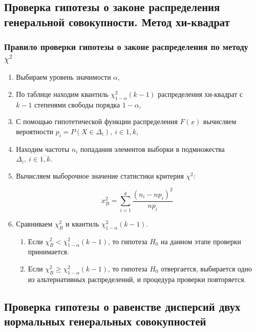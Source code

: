 \documentclass[12pt,a4paper]{article}
\begin{document}
	\subsection{Проверка гипотезы о законе распределения генеральной
		совокупности. Метод хи-квадрат}

	\subsubsection{Правило проверки гипотезы о законе распределения по
		методу \( \chi^2 \)}

	\begin{enumerate}
		\item Выбираем уровень значимости \( \alpha \),
		\item По таблице находим квантиль \( \chi_{1-\alpha}^2 (k - 1) \)
			распределения хи-квадрат с \( k - 1 \) степенями свободы порядка
			\( 1 - \alpha \),
		\item С помощью гипотетической функции распределения \( F(x) \)
			вычисляем вероятности
			\( p_i = P(X \in \Delta_i), \ i \in \overline{1,k} \),
		\item Находим частоты \( n_i \) попадания элементов выборки в
			подмножества \( \Delta_i, \ i \in \overline{1,k} \).
		\item Вычисляем выборочное значение статистики критерия \( \chi^2 \):

		\[ x_B^2 = \sum_{i=1}^k \frac{(n_i - np_i)^2}{np_i} \]

		\item Сравниваем \( \chi_B^2 \) и квантиль
			\( \chi_{1 - \alpha}^2 (k - 1) \).

		\begin{enumerate}
			\item Если \( \chi_B^2 < \chi_{1 - \alpha}^2 (k - 1) \), то гипотеза
				\( H_0 \) на данном этапе проверки принимается.
			\item Если \( \chi_B^2 \geqslant \chi_{1 - \alpha}^2 (k - 1) \), то
				гипотеза \( H_0 \) отвергается, выбирается одно из
				альтернативных распределений, и процедура проверки
				повторяется.
		\end{enumerate}
	\end{enumerate}

	\subsection{Проверка гипотезы о равенстве дисперсий двух нормальных
		генеральных совокупностей}
\end{document}
